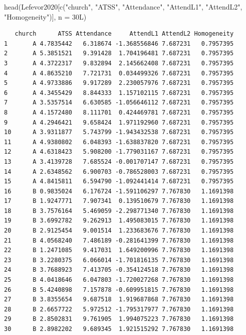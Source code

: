 \documentclass[
  english,
]{book}
\newenvironment{Shaded}{\begin{snugshade}}{\end{snugshade}}
\newcommand{\AttributeTok}[1]{\textcolor[rgb]{0.77,0.63,0.00}{#1}}
\newcommand{\FunctionTok}[1]{\textcolor[rgb]{0.00,0.00,0.00}{#1}}
\newcommand{\NormalTok}[1]{#1}
\newcommand{\StringTok}[1]{\textcolor[rgb]{0.31,0.60,0.02}{#1}}
\begin{document}
\begin{Shaded}
\begin{Highlighting}[]
\FunctionTok{head}\NormalTok{(Lefevor2020[}\FunctionTok{c}\NormalTok{(}\StringTok{"church"}\NormalTok{, }\StringTok{"ATSS"}\NormalTok{, }\StringTok{"Attendance"}\NormalTok{, }\StringTok{"AttendL1"}\NormalTok{, }\StringTok{"AttendL2"}\NormalTok{, }\StringTok{"Homogeneity"}\NormalTok{)], }\AttributeTok{n =}\NormalTok{ 30L)}
\end{Highlighting}
\end{Shaded}

\begin{verbatim}
   church      ATSS Attendance     AttendL1 AttendL2 Homogeneity
1       A 4.7835442   6.318674 -1.368556846 7.687231   0.7957395
2       A 5.3851521   9.391428  1.704196481 7.687231   0.7957395
3       A 4.3722317   9.832894  2.145662408 7.687231   0.7957395
4       A 4.8635210   7.721731  0.034499326 7.687231   0.7957395
5       A 4.9733886   9.917289  2.230057976 7.687231   0.7957395
6       A 4.3455429   8.844333  1.157102115 7.687231   0.7957395
7       A 3.5357514   6.630585 -1.056646112 7.687231   0.7957395
8       A 4.1572480   8.111701  0.424469781 7.687231   0.7957395
9       A 4.2946421   9.658424  1.971192960 7.687231   0.7957395
10      A 3.9311877   5.743799 -1.943432538 7.687231   0.7957395
11      A 4.9380802   6.048393 -1.638837820 7.687231   0.7957395
12      A 4.6318423   5.908200 -1.779031167 7.687231   0.7957395
13      A 3.4139728   7.685524 -0.001707147 7.687231   0.7957395
14      A 2.6348562   6.900703 -0.786528003 7.687231   0.7957395
15      A 4.8415811   6.594790 -1.092441414 7.687231   0.7957395
16      B 0.9835024   6.176724 -1.591106297 7.767830   1.1691398
17      B 1.9247771   7.907341  0.139510679 7.767830   1.1691398
18      B 3.7576164   5.469059 -2.298771340 7.767830   1.1691398
19      B 3.6992782   9.262913  1.495083015 7.767830   1.1691398
20      B 2.9125454   9.001514  1.233683676 7.767830   1.1691398
21      B 4.0568240   7.486189 -0.281641399 7.767830   1.1691398
22      B 1.2471085   9.417031  1.649200996 7.767830   1.1691398
23      B 3.2280375   6.066014 -1.701816135 7.767830   1.1691398
24      B 3.7688923   7.413705 -0.354124518 7.767830   1.1691398
25      B 4.0418646   6.047803 -1.720027268 7.767830   1.1691398
26      B 5.4240898   7.157878 -0.609951815 7.767830   1.1691398
27      B 3.8355654   9.687518  1.919687868 7.767830   1.1691398
28      B 2.6657722   5.972512 -1.795317977 7.767830   1.1691398
29      B 2.8502831   9.761905  1.994075223 7.767830   1.1691398
30      B 2.8982202   9.689345  1.921515292 7.767830   1.1691398
\end{verbatim}
\end{document}
